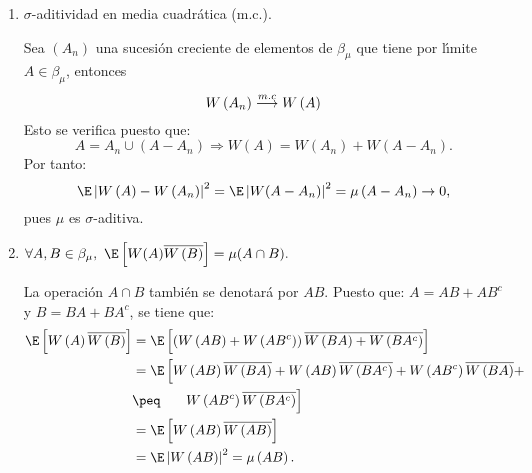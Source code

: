 \begin{enumerate}
\item $\sigma$-aditividad en media cuadr\'{a}tica (m.c.).

Sea $\left( A_{n} \right)$ una sucesi\'{o}n creciente de elementos de $\beta_{\mu }$ que tiene por l\'{\i}mite $A\in \beta_{\mu }$, entonces
\[
W\left( A_{n} \right)\buildrel {m.c} \over \longrightarrow W\left( A 
\right)
\]
Esto se verifica puesto que: 
\[
A=A_{n}\cup \left( A-A_{n} \right)\Longrightarrow W\left( A \right)=W\left( 
A_{n} \right)+W\left( A-A_{n} \right).
\]
Por tanto: 
\[
\E\left| W\left( A \right)-W\left( A_{n} \right) \right|^{2}=\E\left| 
W(A-A_{n}) \right|^{2}=\mu \left( A-A_{n} \right)\to 0,
\]
pues $\mu$ es $\sigma $-aditiva.

\item $\forall A,B\in \beta_{\mu },\ \E\left[ W(A)\overline{W\left( B \right)} \right]=\mu (A\cap B).$

La operaci\'{o}n $A\cap B$ tambi\'{e}n se denotar\'{a} por $AB$. Puesto que: 
$A=AB+AB^{c}$ y $B=BA+BA^{c}$, se tiene que:
\begin{align*}
 \E\left[ W\left( A \right)\overline{W\left( B \right)} \right]
	&= \E\left[ \left( W\left( AB \right)+W\left( AB^{c} \right) \right)\overline{W\left( BA \right)+W\left( BA^{c} \right)} \right]\\
	&= \E\left[ W\left( AB \right)\overline{W\left( BA \right)}+W\left( AB  \right)\overline{W\left( BA^{c} \right)}+W\left( AB^{c} \right)\overline{W\left( BA   \right)}+\right.\\
	&\peq \phantom{\E[[}\left.W\left( AB^{c} \right)\overline{W\left( BA^{c} \right)} \right]\\
	&=\E\left[ W\left( AB \right)\overline{W\left( AB \right)} \right]\\
	&=\E\left| W\left(AB \right) \right|^{2}=\mu \left( AB \right).
\end{align*}
\end{enumerate}

